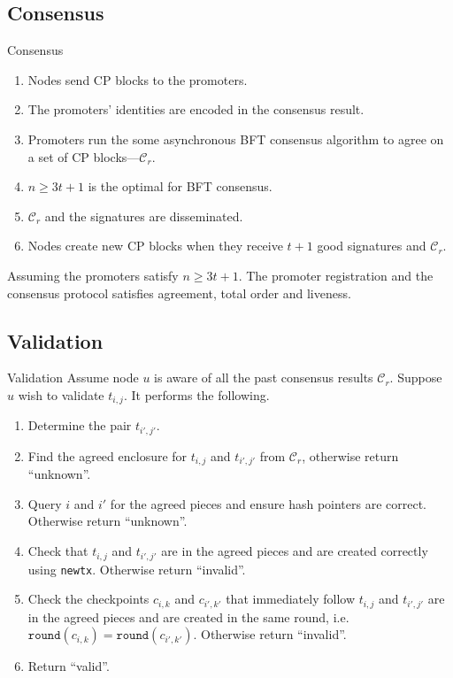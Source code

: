 \documentclass{beamer}
\begin{document}
\subsection{Consensus}
\begin{frame}{Consensus}
  \begin{enumerate}
    \item Nodes send CP blocks to the promoters.
    \item The promoters' identities are encoded in the consensus result.
    \item Promoters run the some asynchronous BFT consensus algorithm to agree on
      a set of CP blocks---$\mathcal{C}_r$.
    \item $n \ge 3t + 1$ is the optimal for BFT consensus.
    \item $\mathcal{C}_r$ and the signatures are disseminated.
    \item Nodes create new CP blocks when they receive $t + 1$ good signatures and
      $\mathcal{C}_r$.
  \end{enumerate}

  \begin{theorem}
    Assuming the promoters satisfy $n \ge 3t + 1$. The promoter registration and
    the consensus protocol satisfies agreement, total order and liveness.
  \end{theorem}
\end{frame}

\subsection{Validation}

\begin{frame}{Validation}
Assume node $u$ is aware of all the past consensus results $\mathcal{C}_r$.
Suppose $u$ wish to validate $t_{i,j}$. It performs the following.

\begin{enumerate}
\item Determine the pair $t_{i', j'}$.
\item Find the agreed enclosure for $t_{i,j}$ and $t_{i', j'}$ from
  $\mathcal{C}_r$, otherwise return ``unknown''.
\item Query $i$ and $i'$ for the agreed pieces and ensure hash pointers are
  correct. Otherwise return ``unknown''.
\item Check that $t_{i,j}$ and $t_{i', j'}$ are in the agreed pieces and are
  created correctly using \texttt{newtx}. Otherwise return ``invalid''.
\item Check the checkpoints $c_{i, k}$ and $c_{i', k'}$ that immediately follow
  $t_{i,j}$ and $t_{i', j'}$ are in the agreed pieces and are created in the
  same round, i.e. $\texttt{round}(c_{i, k}) = \texttt{round}(c_{i', k'})$.
  Otherwise return ``invalid''.
\item Return ``valid''.
\end{enumerate}
\end{frame}
\end{document}
